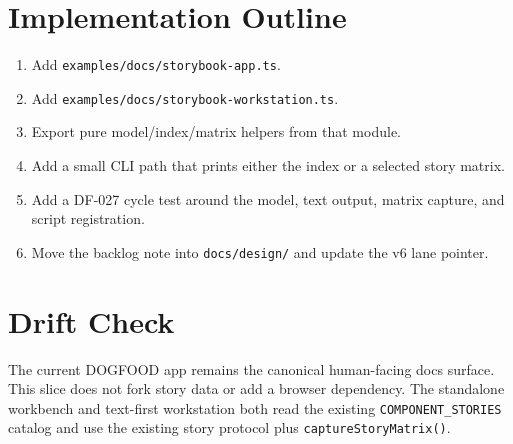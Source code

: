 \section{Implementation Outline}\label{record-088-implementation-outline}

\begin{enumerate}
\def\labelenumi{\arabic{enumi}.}
\tightlist
\item
  Add \texttt{e\allowbreak{}x\allowbreak{}a\allowbreak{}m\allowbreak{}p\allowbreak{}l\allowbreak{}e\allowbreak{}s\allowbreak{}/\allowbreak{}d\allowbreak{}o\allowbreak{}c\allowbreak{}s\allowbreak{}/\allowbreak{}s\allowbreak{}t\allowbreak{}o\allowbreak{}r\allowbreak{}y\allowbreak{}b\allowbreak{}o\allowbreak{}o\allowbreak{}k\allowbreak{}-\allowbreak{}a\allowbreak{}p\allowbreak{}p\allowbreak{}.\allowbreak{}t\allowbreak{}s}.
\item
  Add \texttt{e\allowbreak{}x\allowbreak{}a\allowbreak{}m\allowbreak{}p\allowbreak{}l\allowbreak{}e\allowbreak{}s\allowbreak{}/\allowbreak{}d\allowbreak{}o\allowbreak{}c\allowbreak{}s\allowbreak{}/\allowbreak{}s\allowbreak{}t\allowbreak{}o\allowbreak{}r\allowbreak{}y\allowbreak{}b\allowbreak{}o\allowbreak{}o\allowbreak{}k\allowbreak{}-\allowbreak{}w\allowbreak{}o\allowbreak{}r\allowbreak{}k\allowbreak{}s\allowbreak{}t\allowbreak{}a\allowbreak{}t\allowbreak{}i\allowbreak{}o\allowbreak{}n\allowbreak{}.\allowbreak{}t\allowbreak{}s}.
\item
  Export pure model/index/matrix helpers from that module.
\item
  Add a small CLI path that prints either the index or a selected story matrix.
\item
  Add a DF-027 cycle test around the model, text output, matrix capture, and script registration.
\item
  Move the backlog note into \texttt{d\allowbreak{}o\allowbreak{}c\allowbreak{}s\allowbreak{}/\allowbreak{}d\allowbreak{}e\allowbreak{}s\allowbreak{}i\allowbreak{}g\allowbreak{}n\allowbreak{}/} and update the v6 lane pointer.
\end{enumerate}

\section{Drift Check}\label{record-088-drift-check}

The current DOGFOOD app remains the canonical human-facing docs surface. This slice does not fork story data or add a browser dependency. The standalone workbench and text-first workstation both read the existing \texttt{C\allowbreak{}O\allowbreak{}M\allowbreak{}P\allowbreak{}O\allowbreak{}N\allowbreak{}E\allowbreak{}N\allowbreak{}T\allowbreak{}\_\allowbreak{}S\allowbreak{}T\allowbreak{}O\allowbreak{}R\allowbreak{}I\allowbreak{}E\allowbreak{}S} catalog and use the existing story protocol plus \texttt{c\allowbreak{}a\allowbreak{}p\allowbreak{}t\allowbreak{}u\allowbreak{}r\allowbreak{}e\allowbreak{}S\allowbreak{}t\allowbreak{}o\allowbreak{}r\allowbreak{}y\allowbreak{}M\allowbreak{}a\allowbreak{}t\allowbreak{}r\allowbreak{}i\allowbreak{}x\allowbreak{}(\allowbreak{})}.

